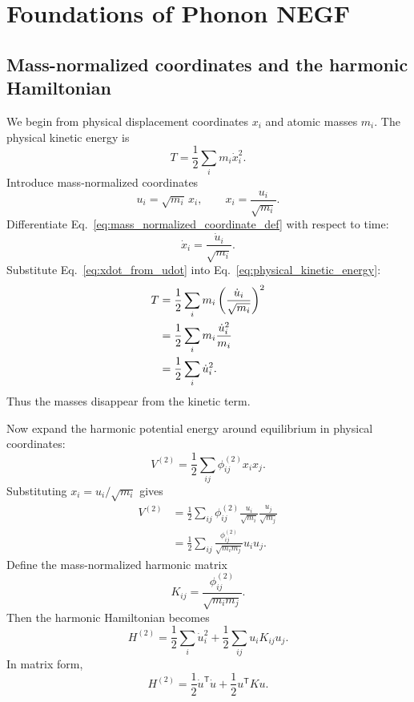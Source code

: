 \section{Foundations of Phonon NEGF}

\subsection{Mass-normalized coordinates and the harmonic Hamiltonian}
We begin from physical displacement coordinates $x_i$ and atomic masses $m_i$. The physical kinetic energy is
\begin{equation}
    T = \frac{1}{2}\sum_i m_i \dot x_i^2.
    \label{eq:physical_kinetic_energy}
\end{equation}
Introduce mass-normalized coordinates
\begin{equation}
    u_i = \sqrt{m_i}\,x_i,
    \qquad
    x_i = \frac{u_i}{\sqrt{m_i}}.
    \label{eq:mass_normalized_coordinate_def}
\end{equation}
Differentiate Eq.~\eqref{eq:mass_normalized_coordinate_def} with respect to time:
\begin{equation}
    \dot x_i = \frac{\dot u_i}{\sqrt{m_i}}.
    \label{eq:xdot_from_udot}
\end{equation}
Substitute Eq.~\eqref{eq:xdot_from_udot} into Eq.~\eqref{eq:physical_kinetic_energy}:
\begin{align}
    T
    &= \frac{1}{2}\sum_i m_i \left( \frac{\dot u_i}{\sqrt{m_i}} \right)^2 \\
    &= \frac{1}{2}\sum_i m_i \frac{\dot u_i^2}{m_i} \\
    &= \frac{1}{2}\sum_i \dot u_i^2.
    \label{eq:kinetic_energy_mass_normalized}
\end{align}
Thus the masses disappear from the kinetic term.

Now expand the harmonic potential energy around equilibrium in physical coordinates:
\begin{equation}
    V^{(2)} = \frac{1}{2}\sum_{ij}\phi^{(2)}_{ij}x_i x_j.
    \label{eq:physical_harmonic_potential}
\end{equation}
Substituting $x_i = u_i/\sqrt{m_i}$ gives
\begin{align}
    V^{(2)}
    &= \frac{1}{2}\sum_{ij}\phi^{(2)}_{ij}\frac{u_i}{\sqrt{m_i}}\frac{u_j}{\sqrt{m_j}} \\
    &= \frac{1}{2}\sum_{ij}\frac{\phi^{(2)}_{ij}}{\sqrt{m_i m_j}}u_i u_j.
\end{align}
Define the mass-normalized harmonic matrix
\begin{equation}
    K_{ij} = \frac{\phi^{(2)}_{ij}}{\sqrt{m_i m_j}}.
    \label{eq:mass_normalized_harmonic_matrix}
\end{equation}
Then the harmonic Hamiltonian becomes
\begin{equation}
    H^{(2)} = \frac{1}{2}\sum_i \dot u_i^2 + \frac{1}{2}\sum_{ij}u_i K_{ij}u_j.
    \label{eq:harmonic_hamiltonian_mass_normalized}
\end{equation}
In matrix form,
\begin{equation}
    H^{(2)} = \frac{1}{2}\dot u^{\mathsf T}\dot u + \frac{1}{2}u^{\mathsf T}K u.
    \label{eq:harmonic_hamiltonian_matrix_form}
\end{equation}

